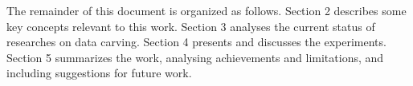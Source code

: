 
The remainder of this document is organized as follows.
    Section 2 describes some key concepts relevant to this work. 
    Section 3 analyses the current status of researches on data carving. 
    Section 4 presents and discusses the experiments.
    Section 5 summarizes the work, analysing achievements and limitations, and including suggestions for future work.
